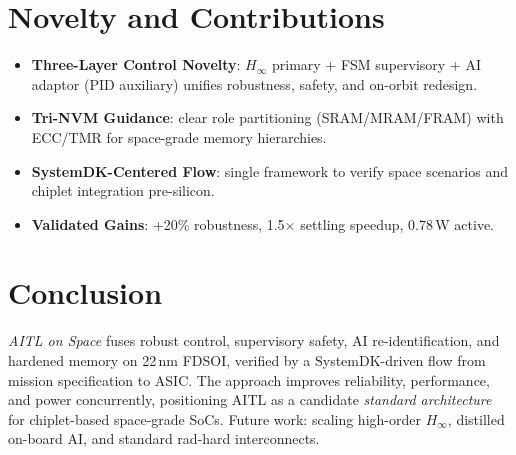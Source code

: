 \documentclass[conference]{IEEEtran}
\begin{document}
\section*{Novelty and Contributions}
\begin{itemize}
  \item \textbf{Three-Layer Control Novelty}: $H_\infty$ primary + FSM supervisory + AI adaptor
  (PID auxiliary) unifies robustness, safety, and on-orbit redesign.
  \item \textbf{Tri-NVM Guidance}: clear role partitioning (SRAM/MRAM/FRAM) with ECC/TMR
  for space-grade memory hierarchies.
  \item \textbf{SystemDK-Centered Flow}: single framework to verify space scenarios and
  chiplet integration pre-silicon.
  \item \textbf{Validated Gains}: +20\% robustness, 1.5$\times$ settling speedup, 0.78\,W active.
\end{itemize}

\section*{Conclusion}
\emph{AITL on Space} fuses robust control, supervisory safety, AI re-identification,
and hardened memory on 22\,nm FDSOI, verified by a SystemDK-driven flow
from mission specification to ASIC. The approach improves reliability, performance,
and power concurrently, positioning AITL as a candidate \emph{standard architecture}
for chiplet-based space-grade SoCs. Future work: scaling high-order $H_\infty$,
distilled on-board AI, and standard rad-hard interconnects.
\end{document}
